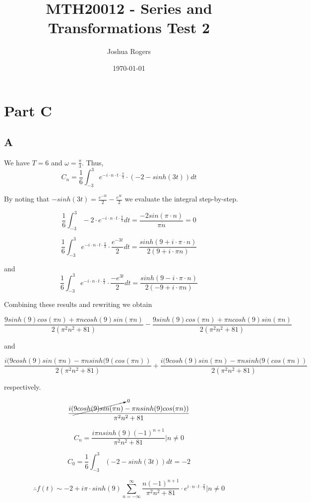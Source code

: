 \documentclass{article}
\title{\vspace{-4cm}MTH20012 - Series and Transformations Test 2}
\author{Joshua Rogers}
\date\today
\begin{document}
\maketitle 

\section*{Part C}

\subsection*{A}

We have $T=6$ and $\omega = \frac{\pi}{3}$. Thus,
$$C_n = \frac{1}{6} \int_{-3}^{3} e^{-i \cdot n \cdot t \cdot \frac{\pi}{3}} \cdot \left(-2-sinh(3t)\right) dt$$

By noting that $-sinh(3t) = \frac{e^{-3t}}{2} - \frac{e^{3t}}{2}$ we evaluate the integral step-by-step.

$$
\frac{1}{6} \int_{-3}^{3} -2 \cdot e^{-i \cdot n \cdot t \cdot \frac{\pi}{3}} dt = \frac{-2sin(\pi \cdot n)}{\pi \dot n} = 0
$$

$$
\frac{1}{6} \int_{-3}^{3}  e^{-i \cdot n \cdot t \cdot \frac{\pi}{3}} \cdot \frac{e^{-3t}}{2} dt = \frac{sinh(9+i\cdot \pi \cdot n)}{2(9 + i\cdot \pi n)}
$$

and
$$
\frac{1}{6} \int_{-3}^{3}  e^{-i \cdot n \cdot t \cdot \frac{\pi}{3}} \cdot \frac{-e^{3t}}{2} dt = \frac{sinh(9-i\cdot \pi \cdot n)}{2(-9 + i\cdot \pi n)}
$$

Combining these results and rewriting we obtain

$$
\frac{9sinh(9)cos(\pi n)+\pi n cosh(9) sin(\pi n)}{2(\pi^2n^2+81)} - \frac{9sinh(9)cos(\pi n)+\pi n cosh(9) sin(\pi n)}{2(\pi^2n^2+81)}
$$

and

$$
\frac{i(9cosh(9)sin(\pi n) - \pi n sinh(9( cos(\pi n))}{2(\pi^2n^2+81)} + \frac{i(9cosh(9)sin(\pi n) - \pi n sinh(9( cos(\pi n))}{2(\pi^2n^2+81)}
$$

respectively.

$$
\frac{i(\cancelto{0}{9cosh(9)sin(\pi n)} - \pi n sinh(9) cos(\pi n))}{\pi^2n^2+81}
$$

$$
C_n = \frac{i\pi n sinh(9)\left(-1\right)^{n+1}}{\pi^2n^2+81} \Bigr|n \neq 0
$$

$$
C_0 = \frac{1}{6} \int_{-3}^{3} (-2-sinh(3t)) dt = -2
$$

$$
\therefore f(t) \sim -2 + i \pi \cdot sinh(9) \sum_{n=-\infty}^{\infty} \frac{n\left(-1\right)^{n+1}}{\pi^2n^2+81} \cdot e^{i \cdot n \cdot t \cdot \frac{\pi}{3}} \Bigr|n \neq 0
$$
\end{document}
